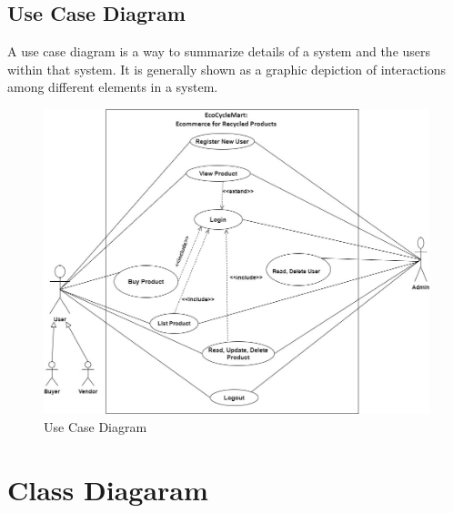 \documentclass[12pt, a4paper, oneside]{article}
\begin{document}




\pagebreak
\subsection*{Use Case Diagram}
A use case diagram is a way to summarize details of a system and the users within that system. It is generally shown 
as a graphic depiction of interactions among different elements in a system.
\begin{figure}[H]
\includegraphics[width=\linewidth ]{use_case_diagram}
\centering
\caption{Use Case Diagram}
\label{fig:use_case_diagram}
\end{figure}

\pagebreak
\section*{Class Diagaram}
\end{document}
